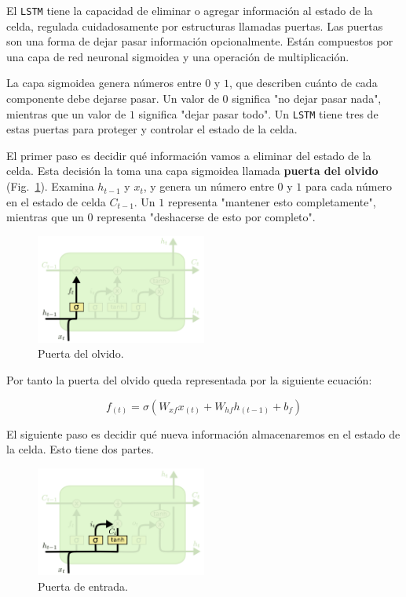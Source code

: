 \documentclass[a4paper,12pt]{article}
\begin{document}
El \texttt{LSTM} tiene la capacidad de eliminar o agregar información al estado de la celda, regulada cuidadosamente por estructuras llamadas puertas. Las puertas son una forma de dejar pasar información opcionalmente. Están compuestos por una capa de red neuronal sigmoidea y una operación de multiplicación.

La capa sigmoidea genera números entre $0$ y $1$, que describen cuánto de cada componente debe dejarse pasar. Un valor de $0$ significa "no dejar pasar nada", mientras que un valor de $1$ significa "dejar pasar todo". Un \texttt{LSTM} tiene tres de estas puertas para proteger y controlar el estado de la celda.

El primer paso es decidir qué información vamos a eliminar del estado de la celda. Esta decisión la toma una capa sigmoidea llamada \textbf{puerta del olvido} (Fig.~\ref{fig:lstm2}). Examina $h_{t-1}$ y $x_t$, y genera un número entre $0$ y $1$ para cada número en el estado de celda $C_{t-1}$. Un $1$ representa "mantener esto completamente", mientras que un $0$ representa "deshacerse de esto por completo".

\begin{figure}[H]
	\begin{center}				
	\includegraphics[width=0.5\textwidth]{lstm2.png}
  	\caption{Puerta del olvido.}
  	\label{fig:lstm2}
  	\end{center}
\end{figure}

Por tanto la puerta del olvido queda representada por la siguiente ecuación:

$$f_{(t)} = \sigma (W_{xf}x_{(t)} + W_{hf}h_{(t-1)} + b_f)$$

El siguiente paso es decidir qué nueva información almacenaremos en el estado de la celda. Esto tiene dos partes. 

\begin{figure}[H]
	\begin{center}				
	\includegraphics[width=0.5\textwidth]{lstm3.png}
  	\caption{Puerta de entrada.}
  	\label{fig:lstm3}
  	\end{center}
\end{figure}
\end{document}
